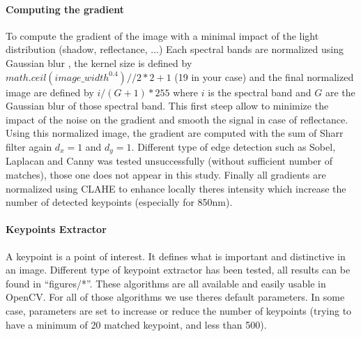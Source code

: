 \documentclass[]{elsarticle}
\begin{document}
	\paragraph{Computing the gradient} To compute the gradient of the image with a minimal impact of the light distribution (shadow, reflectance, ...)
	Each spectral bands are normalized using Gaussian blur \cite{sage0303}, the kernel size is defined by $math.ceil(image\_width^{0.4}) // 2 * 2 +1$ (19 in your case)
	and the final normalized image are defined by $i/(G+1)*255$ where $i$ is the spectral band and $G$ are the Gaussian blur of those spectral band.
	This first steep allow to minimize the impact of the noise on the gradient and smooth the signal in case of reflectance.
	Using this normalized image, the gradient are computed with the sum of Sharr filter \cite{Seitz} again $d_x=1$ and $d_y=1$.
	Different type of edge detection such as Sobel, Laplacan and Canny was tested unsuccessfully (without sufficient number of matches), those one does not appear in this study.
	Finally all gradients are normalized using CLAHE \cite{zuiderveld1994contrast} to enhance locally theres intensity which increase the number of detected keypoints (especially for 850nm).
	
	\paragraph{Keypoints Extractor}
	A keypoint is a point of interest. It defines what is important and distinctive in an image.
	Different type of keypoint extractor has been tested, all results can be found in ``figures/*''.
	These algorithms are all available and easily usable in OpenCV.
	For all of those algorithms we use theres default parameters.
	In some case, parameters are set to increase or reduce the number of keypoints (trying to have a minimum of 20 matched keypoint, and less than 500).
	
\end{document}
